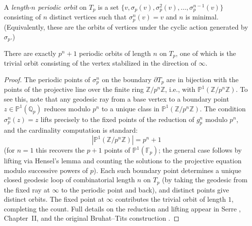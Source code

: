 A \emph{length-\(n\) periodic orbit} on \(T_p\) is a set \(\{v, \sigma_p(v), \sigma_p^2(v), \dots, \sigma_p^{n-1}(v)\}\) consisting of \(n\) distinct vertices such that \(\sigma_p^n(v) = v\) and \(n\) is minimal. (Equivalently, these are the orbits of vertices under the cyclic action generated by \(\sigma_p\).)

\begin{proposition}
There are exactly \(p^n + 1\) periodic orbits of length \(n\) on \(T_p\), one of which is the trivial orbit consisting of the vertex stabilized in the direction of \(\infty\).
\end{proposition}

\begin{proof}
The periodic points of \(\sigma_p^n\) on the boundary \(\partial T_p\) are in bijection with the points of the projective line over the finite ring \(\mathbb{Z}/p^n\mathbb{Z}\), i.e., with \(\mathbb{P}^1(\mathbb{Z}/p^n \mathbb{Z})\). To see this, note that any geodesic ray from a base vertex to a boundary point \(z \in \mathbb{P}^1(\mathbb{Q}_p)\) reduces modulo \(p^n\) to a unique class in \(\mathbb{P}^1(\mathbb{Z}/p^n \mathbb{Z})\). The condition \(\sigma_p^n(z) = z\) lifts precisely to the fixed points of the reduction of \(g_p^n\) modulo \(p^n\), and the cardinality computation is standard:
\[
|\mathbb{P}^1(\mathbb{Z}/p^n \mathbb{Z})| = p^n + 1
\]
(for \(n=1\) this recovers the \(p+1\) points of \(\mathbb{P}^1(\mathbb{F}_p)\); the general case follows by lifting via Hensel's lemma and counting the solutions to the projective equation modulo successive powers of \(p\)). Each such boundary point determines a unique closed geodesic loop of combinatorial length \(n\) on \(T_p\) (by taking the geodesic from the fixed ray at \(\infty\) to the periodic point and back), and distinct points give distinct orbits. The fixed point at \(\infty\) contributes the trivial orbit of length \(1\), completing the count. Full details on the reduction and lifting appear in Serre \cite{Serre80}, Chapter~II, and the original Bruhat--Tits construction \cite{BruhatTits72}.
\end{proof}

